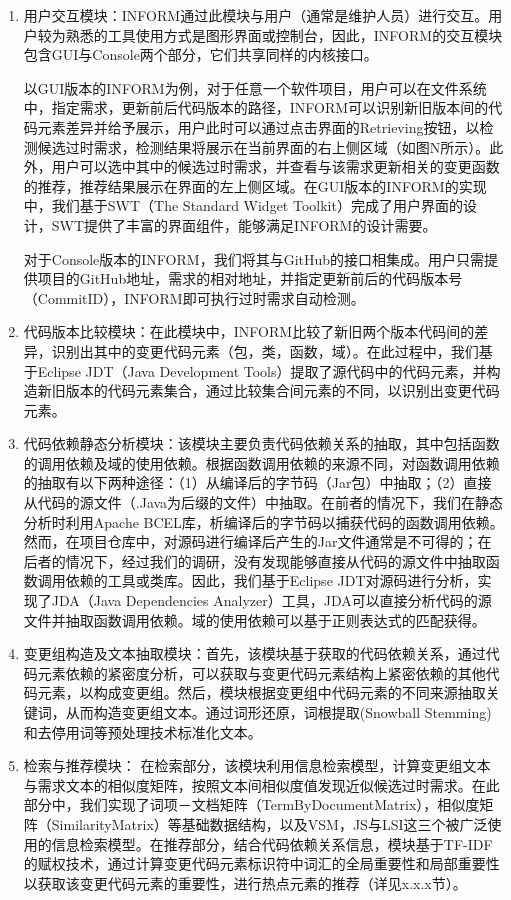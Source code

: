 \begin{enumerate}
  \item 用户交互模块：INFORM通过此模块与用户（通常是维护人员）进行交互。用户较为熟悉的工具使用方式是图形界面或控制台，因此，INFORM的交互模块包含GUI与Console两个部分，它们共享同样的内核接口。

  以GUI版本的INFORM为例，对于任意一个软件项目，用户可以在文件系统中，指定需求，更新前后代码版本的路径，INFORM可以识别新旧版本间的代码元素差异并给予展示，用户此时可以通过点击界面的Retrieving按钮，以检测候选过时需求，检测结果将展示在当前界面的右上侧区域（如图N所示）。此外，用户可以选中其中的候选过时需求，并查看与该需求更新相关的变更函数的推荐，推荐结果展示在界面的左上侧区域。在GUI版本的INFORM的实现中，我们基于SWT（The Standard Widget Toolkit）完成了用户界面的设计，SWT提供了丰富的界面组件，能够满足INFORM的设计需要。

  对于Console版本的INFORM，我们将其与GitHub的接口相集成。用户只需提供项目的GitHub地址，需求的相对地址，并指定更新前后的代码版本号（CommitID），INFORM即可执行过时需求自动检测。
  \item 代码版本比较模块：在此模块中，INFORM比较了新旧两个版本代码间的差异，识别出其中的变更代码元素（包，类，函数，域）。在此过程中，我们基于Eclipse JDT（Java Development Tools）提取了源代码中的代码元素，并构造新旧版本的代码元素集合，通过比较集合间元素的不同，以识别出变更代码元素。

  \item 代码依赖静态分析模块：该模块主要负责代码依赖关系的抽取，其中包括函数的调用依赖及域的使用依赖。根据函数调用依赖的来源不同，对函数调用依赖的抽取有以下两种途径：（1）从编译后的字节码（Jar包）中抽取；（2）直接从代码的源文件（.Java为后缀的文件）中抽取。在前者的情况下，我们在静态分析时利用Apache BCEL库，析编译后的字节码以捕获代码的函数调用依赖。然而，在项目仓库中，对源码进行编译后产生的Jar文件通常是不可得的；在后者的情况下，经过我们的调研，没有发现能够直接从代码的源文件中抽取函数调用依赖的工具或类库。因此，我们基于Eclipse JDT对源码进行分析，实现了JDA（Java Dependencies Analyzer）工具，JDA可以直接分析代码的源文件并抽取函数调用依赖。域的使用依赖可以基于正则表达式的匹配获得。

  \item 变更组构造及文本抽取模块：首先，该模块基于获取的代码依赖关系，通过代码元素依赖的紧密度分析，可以获取与变更代码元素结构上紧密依赖的其他代码元素，以构成变更组。然后，模块根据变更组中代码元素的不同来源抽取关键词，从而构造变更组文本。通过词形还原，词根提取(Snowball Stemming)和去停用词等预处理技术标准化文本。

  \item 检索与推荐模块：
  在检索部分，该模块利用信息检索模型，计算变更组文本与需求文本的相似度矩阵，按照文本间相似度值发现近似候选过时需求。在此部分中，我们实现了词项－文档矩阵（TermByDocumentMatrix），相似度矩阵（SimilarityMatrix）等基础数据结构，以及VSM，JS与LSI这三个被广泛使用的信息检索模型。在推荐部分，结合代码依赖关系信息，模块基于TF-IDF的赋权技术，通过计算变更代码元素标识符中词汇的全局重要性和局部重要性以获取该变更代码元素的重要性，进行热点元素的推荐（详见x.x.x节）。
\end{enumerate}

